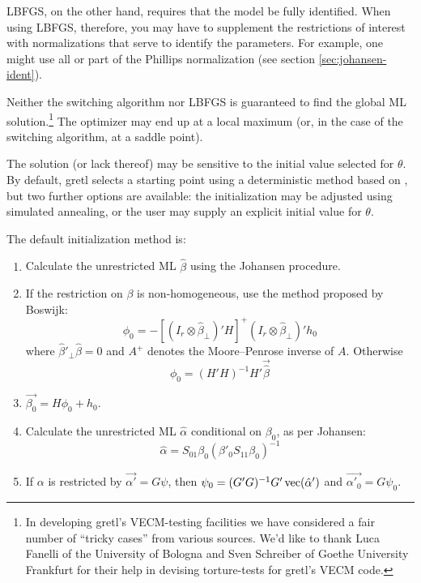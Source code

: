 LBFGS, on the other hand, requires that the model be fully identified.
When using LBFGS, therefore, you may have to supplement the
restrictions of interest with normalizations that serve to identify
the parameters.  For example, one might use all or part of the
Phillips normalization (see section \ref{sec:johansen-ident}).

Neither the switching algorithm nor LBFGS is guaranteed to find the
global ML solution.\footnote{In developing gretl's VECM-testing
  facilities we have considered a fair number of ``tricky cases'' from
  various sources. We'd like to thank Luca Fanelli of the University
  of Bologna and Sven Schreiber of Goethe University Frankfurt
  for their help in devising torture-tests for gretl's VECM
  code.} The optimizer may end up at a local maximum (or, in the case
of the switching algorithm, at a saddle point).

The solution (or lack thereof) may be sensitive to the initial value
selected for $\theta$.  By default, gretl selects a starting
point using a deterministic method based on \cite{boswijk95}, but two
further options are available: the initialization may be adjusted
using simulated annealing, or the user may supply an explicit initial
value for $\theta$.

The default initialization method is:
%
\begin{enumerate}
\item Calculate the unrestricted ML $\hat{\beta}$ using the
  Johansen procedure.
\item If the restriction on $\beta$ is non-homogeneous, use the
  method proposed by Boswijk:
\begin{equation}
\phi_0 = -[(I_r \otimes \hat{\beta}_{\perp})'H]^+ 
  (I_r \otimes \hat{\beta}_{\perp})' h_0
\end{equation}
where $\hat{\beta}'_{\perp} \hat{\beta} = 0$ and $A^+$ denotes
the Moore--Penrose inverse of $A$.  Otherwise
\begin{equation}
\phi_0 = (H'H)^{-1} H' \vec{\hat{\beta}}
\end{equation}
\item $\vec{\beta_0} = H\phi_0 + h_0$.
\item Calculate the unrestricted ML $\hat{\alpha}$ conditional on
  $\beta_0$, as per Johansen:
\begin{equation}
\label{eq:Jalpha}
\hat{\alpha} = S_{01} \beta_0 (\beta'_0S_{11}\beta_0)^{-1}
\end{equation}
\item If $\alpha$ is restricted by $\vec{\alpha'} = G\psi$, then
  $\psi_0 = (G'G)^{-1}G'\,{\rm vec}(\hat{\alpha}')$ and
  $\vec{\alpha'_0} = G\psi_0$.
\end{enumerate}

